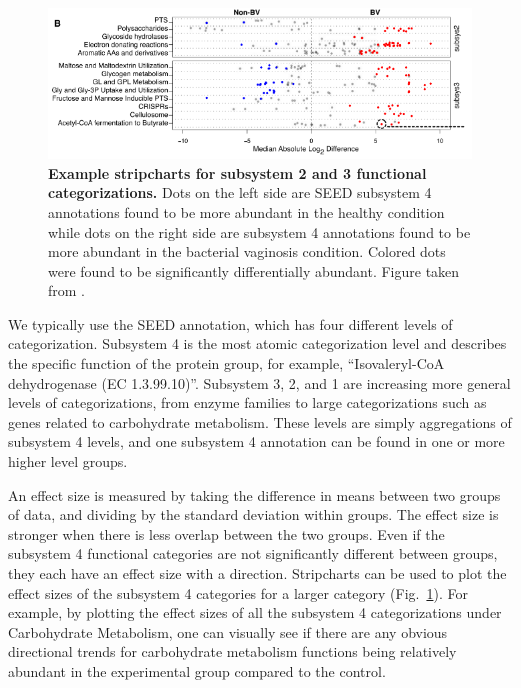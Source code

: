 \begin{figure}[h]
\begin{center}
\includegraphics[width=\textwidth]{stripchart.png}
\caption[Example stripcharts for subsystem 2 and 3 functional categorizations.]{\textbf{Example stripcharts for subsystem 2 and 3 functional categorizations.} Dots on the left side are SEED subsystem 4 annotations found to be more abundant in the healthy condition while dots on the right side are subsystem 4 annotations found to be more abundant in the bacterial vaginosis condition. Colored dots were found to be significantly differentially abundant. Figure taken from \cite{macklaim2013comparative}.}
\end{center}
\label{stripchart_example}
\end{figure}

We typically use the SEED annotation, which has four different levels of categorization. Subsystem 4 is the most atomic categorization level and describes the specific function of the protein group, for example, “Isovaleryl-CoA dehydrogenase (EC 1.3.99.10)”. Subsystem 3, 2, and 1 are increasing more general levels of categorizations, from enzyme families to large categorizations such as genes related to carbohydrate metabolism. These levels are simply aggregations of subsystem 4 levels, and one subsystem 4 annotation can be found in one or more higher level groups.

An effect size is measured by taking the difference in means between two groups of data, and dividing by the standard deviation within groups. The effect size is stronger when there is less overlap between the two groups. Even if the subsystem 4 functional categories are not significantly different between groups, they each have an effect size with a direction. Stripcharts can be used to plot the effect sizes of the subsystem 4 categories for a larger category (Fig.~\ref{stripchart_example}). For example, by plotting the effect sizes of all the subsystem 4 categorizations under Carbohydrate Metabolism, one can visually see if there are any obvious directional trends for carbohydrate metabolism functions being relatively abundant in the experimental group compared to the control.

